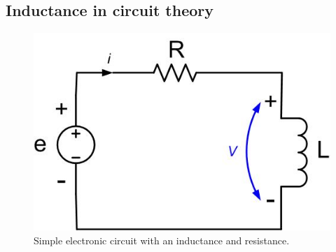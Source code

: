 \documentclass{ximera}
\begin{document}
\subsection{Inductance in circuit theory}


\begin{figure}[htbp]
\begin{center}
\includegraphics[scale=0.5]{../jpg/CircuitwithInductor.jpg}
\end{center}
\caption{Simple electronic circuit with an inductance and resistance. }
\label{MutualInduc}
\end{figure}
\end{document}
